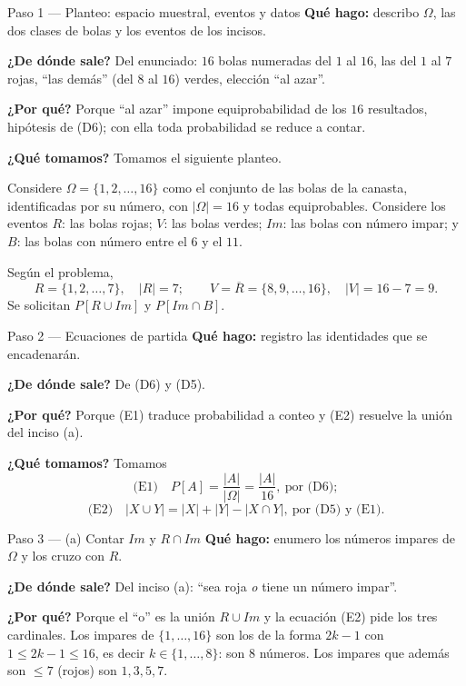 \documentclass[11pt]{article}
\begin{document}
\begin{sol}

\begin{paso}{Paso 1 --- Planteo: espacio muestral, eventos y datos}
\textbf{Qué hago:} describo $\Omega$, las dos clases de bolas y los eventos de los incisos.

\textbf{¿De dónde sale?} Del enunciado: $16$ bolas numeradas del $1$ al $16$, las del $1$ al $7$
rojas, ``las demás'' (del $8$ al $16$) verdes, elección ``al azar''.

\textbf{¿Por qué?} Porque ``al azar'' impone equiprobabilidad de los $16$ resultados, hipótesis
de (D6); con ella toda probabilidad se reduce a contar.

\textbf{¿Qué tomamos?} Tomamos el siguiente planteo.

\medskip
Considere $\Omega=\{1,2,\dots,16\}$ como el conjunto de las bolas de la canasta, identificadas
por su número, con $|\Omega|=16$ y todas equiprobables. Considere los eventos $R$: las bolas
rojas; $V$: las bolas verdes; $Im$: las bolas con número impar; y $B$: las bolas con número
entre el $6$ y el $11$.

Según el problema,
\[
R=\{1,2,\dots,7\},\quad |R|=7;
\qquad
V=\overline{R}=\{8,9,\dots,16\},\quad |V|=16-7=9 .
\]
Se solicitan $P[R\cup Im]$ y $P[Im\cap B]$.
\end{paso}

\begin{paso}{Paso 2 --- Ecuaciones de partida}
\textbf{Qué hago:} registro las identidades que se encadenarán.

\textbf{¿De dónde sale?} De (D6) y (D5).

\textbf{¿Por qué?} Porque (E1) traduce probabilidad a conteo y (E2) resuelve la unión del inciso
(a).

\textbf{¿Qué tomamos?} Tomamos
\[
\text{(E1)}\quad P[A]=\frac{|A|}{|\Omega|}=\frac{|A|}{16},\ \text{por (D6)};
\]
\[
\text{(E2)}\quad |X\cup Y|=|X|+|Y|-|X\cap Y|,\ \text{por (D5) y (E1)}.
\]
\end{paso}

\begin{paso}{Paso 3 --- (a) Contar $Im$ y $R\cap Im$}
\textbf{Qué hago:} enumero los números impares de $\Omega$ y los cruzo con $R$.

\textbf{¿De dónde sale?} Del inciso (a): ``sea roja \emph{o} tiene un número impar''.

\textbf{¿Por qué?} Porque el ``o'' es la unión $R\cup Im$ y la ecuación (E2) pide los tres
cardinales. Los impares de $\{1,\dots,16\}$ son los de la forma $2k-1$ con $1\le 2k-1\le 16$, es
decir $k\in\{1,\dots,8\}$: son $8$ números. Los impares que además son $\le 7$ (rojos) son
$1,3,5,7$.


\end{paso}
\end{sol}
\end{document}
